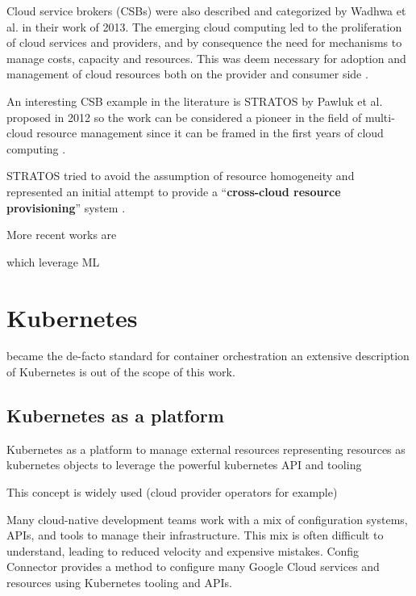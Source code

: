 Cloud service brokers (CSBs) were also described and categorized by Wadhwa et al. \cite{Wadhwa_2013} in their work of 2013.
The emerging cloud computing led to the proliferation of cloud services and providers, and by consequence the need for mechanisms to manage costs, capacity and resources. This was deem necessary for adoption and management of cloud resources both on the provider and consumer side \cite{Wadhwa_2013}.

An interesting CSB example in the literature is STRATOS by Pawluk et al. proposed in 2012 so the work can be considered a pioneer in the field of multi-cloud resource management since it can be framed in the first years of cloud computing \cite{STRATOS}.

STRATOS tried to avoid the assumption of resource homogeneity and represented an initial attempt to provide a ``\textbf{cross-cloud resource provisioning}'' system \cite{STRATOS}.




More recent works are 

which leverage ML

\section{Kubernetes}

became the de-facto standard for container orchestration
an extensive description of Kubernetes is out of the scope of this work.

\subsection{Kubernetes as a platform}

Kubernetes as a platform to manage external resources
representing resources as kubernetes objects to leverage the powerful kubernetes API and tooling

This concept is widely used 
(cloud provider operators for example)

Many cloud-native development teams work with a mix of configuration systems, APIs, and tools to manage their infrastructure. This mix is often difficult to understand, leading to reduced velocity and expensive mistakes. Config Connector provides a method to configure many Google Cloud services and resources using Kubernetes tooling and APIs.

